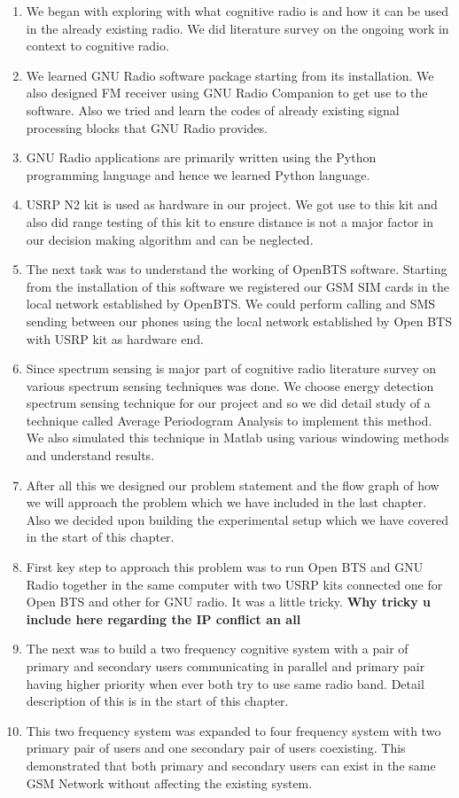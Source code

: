 \begin{enumerate}

\item We began with exploring with what cognitive radio is and how it can be used 
in the already existing radio. We did literature survey on the ongoing work in 
context to cognitive radio. 
\item We learned GNU Radio software package starting from its installation. We 
also designed FM receiver using GNU Radio Companion to get use to the software. 
Also we tried and learn the codes of already existing signal processing blocks 
that GNU Radio provides.
\item GNU Radio applications are primarily written using the Python programming 
language and hence we learned Python language.
\item USRP N2 kit is used as hardware in our project. We got use to this kit and 
also did range testing of this kit to ensure distance is not a major factor in 
our decision making algorithm and can be neglected.
\item The next task was to understand the working of OpenBTS software. Starting 
from the installation of this software we registered our GSM SIM cards in the 
local network established by OpenBTS. We could perform calling and SMS sending 
between our phones using the local network established by Open BTS with USRP 
kit as hardware end.
\item Since spectrum sensing is major part of cognitive radio literature survey 
on various spectrum sensing techniques was done. We choose energy detection 
spectrum sensing technique for our project and so we did detail study of a 
technique called Average Periodogram Analysis to implement this method. We also 
simulated this technique in Matlab using various windowing methods and 
understand results. 
\item After all this we designed our problem statement and the flow graph of 
how we will approach the problem which we have included in the last chapter. 
Also we decided upon building the experimental setup which we have covered in 
the start of this chapter. 
\item  First key step to approach this problem was to run Open BTS and GNU 
Radio together in the same computer with two USRP kits connected one for Open 
BTS and other for GNU radio. It was a little tricky. \textbf{Why tricky u 
include here regarding the IP conflict an all}
\item The next was to build a two frequency cognitive system with a pair of 
primary and secondary users communicating in parallel and primary pair having 
higher priority when ever both try to use same radio band. Detail description 
of this is in the start of this chapter.
\item This two frequency system was expanded to four frequency system with two 
primary pair of users and one secondary pair of users coexisting. This 
demonstrated that both primary and secondary users can exist in the same GSM 
Network without affecting the existing system.
\end{enumerate}